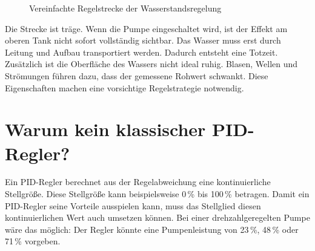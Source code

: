 \documentclass[12pt,a4paper]{scrartcl}
\newcommand{\SI}[2]{#1\,#2}
\newcommand{\percent}{\%}
\begin{document}
\begin{figure}[H]
  \centering
  \caption{Vereinfachte Regelstrecke der Wasserstandsregelung}
\end{figure}

Die Strecke ist träge. Wenn die Pumpe eingeschaltet wird, ist der Effekt am oberen Tank nicht sofort vollständig sichtbar. Das Wasser muss erst durch Leitung und Aufbau transportiert werden. Dadurch entsteht eine Totzeit. Zusätzlich ist die Oberfläche des Wassers nicht ideal ruhig. Blasen, Wellen und Strömungen führen dazu, dass der gemessene Rohwert schwankt. Diese Eigenschaften machen eine vorsichtige Regelstrategie notwendig.

\section{Warum kein klassischer PID-Regler?}

Ein PID-Regler berechnet aus der Regelabweichung eine kontinuierliche Stellgröße. Diese Stellgröße kann beispielsweise \SI{0}{\percent} bis \SI{100}{\percent} betragen. Damit ein PID-Regler seine Vorteile ausspielen kann, muss das Stellglied diesen kontinuierlichen Wert auch umsetzen können. Bei einer drehzahlgeregelten Pumpe wäre das möglich: Der Regler könnte eine Pumpenleistung von \SI{23}{\percent}, \SI{48}{\percent} oder \SI{71}{\percent} vorgeben.
\end{document}

